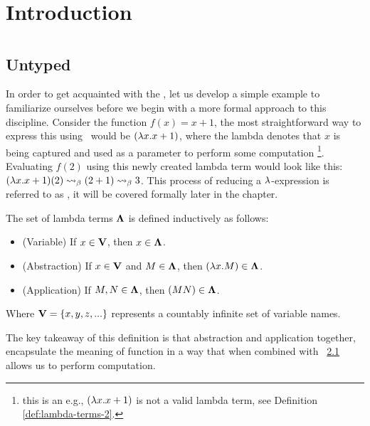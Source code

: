 \documentclass[12pt]{book}
\begin{document}
\chapter{Introduction}


\chapter{\lCalc}


\section{\centering Untyped \lCalc}
In order to get acquainted with the \lcalc, let us develop a simple example to familiarize ourselves before we begin with a more formal approach to this discipline. Consider the function $f(x) = x + 1$, the most straightforward way to express this using \lcalc \ would be $(\lambda x . x + 1 )$, where the lambda denotes that $x$ is being captured and used as a parameter to perform some computation \footnote{this is an e.g., $(\lambda x . x + 1 )$ is not a valid lambda term, see Definition \ref{def:lambda-terms-2}.}. Evaluating $f(2)$ using this newly created lambda term would look like this: $(\lambda x . x + 1)(2) \mathrel{\leadsto}_\beta (2 + 1) \mathrel{\leadsto}_\beta 3$. This process of reducing a $\lambda$-expression is referred to as \bred, it will be covered formally later in the chapter.
\begin{definition} The set of lambda terms \( \mathbf{\Lambda} \) is defined inductively as follows:
  \label{def:lambda-terms-1}
  \begin{itemize}
  \item (Variable) If \( x \in \mathbf{V} \), then \( x \in \mathbf{\Lambda} \).  
  \item (Abstraction) If \( x \in \mathbf{V} \) and \( M \in \mathbf{\Lambda} \), then \( (\lambda x. M) \in \mathbf{\Lambda} \).
  \item (Application) If \( M, N \in \mathbf{\Lambda} \), then \((M N) \in \mathbf{\Lambda} \).
  \end{itemize}
  Where $\mathbf{V} = \{x, y, z, ... \}$ represents a countably infinite set of variable names.
\end{definition}
The key takeaway of this definition is that abstraction and application together, encapsulate the meaning of function in a way that when combined with \bred \ \ref{} allows us to perform computation.
\end{document}
